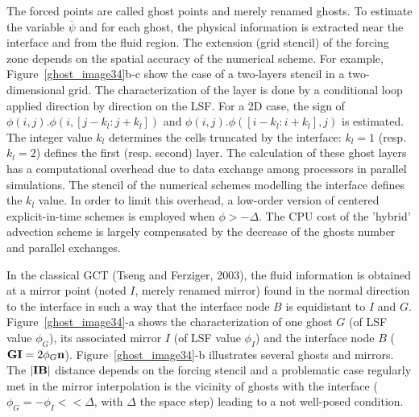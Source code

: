 The forced points are called ghost points and merely renamed ghosts. To estimate the variable $\overline{\psi}$ and for each ghost, the physical information is extracted near the interface and from the fluid region. The extension (grid stencil) of the forcing zone depends on the spatial accuracy of the numerical scheme. For example, Figure~\ref{ghost_image34}b-c show the case of a two-layers stencil in a two-dimensional grid. The characterization of the layer is done by a conditional loop applied direction by direction on the LSF. For a 2D case, the sign of $\phi(i,j).\phi(i,[j-k_l:j+k_l])$ and $\phi(i,j).\phi([i-k_l:i+k_l],j)$ is estimated. The integer value $k_l$ determines the cells truncated by the interface: $k_l=1$ (resp. $k_l=2$) defines the first (resp. second) layer. The calculation of these ghost layers has a computational overhead due to data exchange among processors in parallel simulations. The stencil of the numerical schemes modelling the interface defines the $k_l$ value. In order to limit this overhead, a low-order version of centered explicit-in-time schemes is employed when $\phi > -\Delta$. The CPU cost of the 'hybrid' advection scheme is largely compensated by the decrease of the ghosts number and parallel exchanges.

In the classical GCT (Tseng and Ferziger, 2003), the fluid information is obtained at a mirror point (noted $I$, merely renamed mirror) found in the normal direction to the interface in such a way that the interface node $B$ is equidistant to $I$ and $G$. Figure~\ref{ghost_image34}-a shows the characterization of one ghost $G$ (of LSF value $\phi_G$), its associated mirror $I$ (of LSF value $\phi_I$) and the interface node $B$ (${\bf GI}=2\phi_G {\bf n}$). Figure~\ref{ghost_image34}-b illustrates several ghosts and mirrors. The $| {\bf IB} |$ distance depends on the forcing stencil and a problematic case regularly met in the mirror interpolation is the vicinity of ghosts with the interface ($\phi_G=-\phi_I << \Delta$, with $\Delta$ the space step) leading to a not well-posed condition. \\

